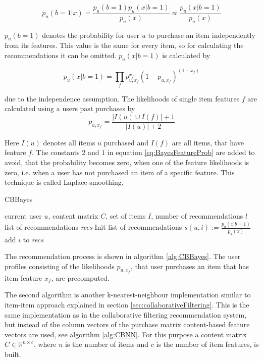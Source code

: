 \documentclass[10pt]{reportMaster}
\begin{document}
\begin{equation}
\label{BayesPost}
	p_u(b=1|x) = \frac{p_u(b=1) p_u(x|b=1)}{p_u(x)} \propto \frac{p_u(x|b=1)}{p_u(x)}
\end{equation}

$p_u(b=1)$ denotes the probability for user $u$ to purchase an item independently from its features.
This value is the same for every item, so for calculating the recommendations it can be omitted.
$p_u(x|b=1)$ is calculated by 

\begin{equation}
\label{BayesEvid}
p_u(x|b=1) = \prod_f{p_{u, x_f}^{x_f}(1-p_{u, x_f})^{(1-x_f)}}
\end{equation}

due to the independence assumption.
The likelihoods of single item features $f$ are calculated using a users past purchases by
\begin{equation}
\label{eq:BayesFeatureProb}
p_{u, x_f} = \frac{|I(u) \cup I(f)|+1}{|I(u)|+2}
\end{equation}

Here $I(u)$ denotes all items $u$ purchased and $I(f)$ are all items, that have feature $f$.
The constants $2$ and $1$ in equation \ref{eq:BayesFeatureProb} are added to avoid, that the probability becomes zero, when one of the feature likelihoods is zero, i.e. when a user has not purchased an item of a specific feature.
This technique is called Laplace-smoothing.

\begin{algorithm}
	\caption[CBBayes]{CBBayes}
	\label{alg:CBBayes}
	\begin{algorithmic}[1]
		\Require current user $u$, content matrix $C$, set of items $I$, number of recommendations $l$
		\Ensure list of recommendations \textit{recs}
		\State Init list of recommendations 
			\State 	$s(u,i) := \frac{p_u(x|b=1)}{p_u(x)}$
				\State add $i$ to \textit{recs}
			\EndIf
		\EndFor
	\end{algorithmic}	
\end{algorithm}

The recommendation process is shown in algorithm \ref{alg:CBBayes}.
The user profiles consisting of the likelihoods $p_{u, x_f}$, that user purchases an item that has item feature $x_f$, are precomputed.

The second algorithm is another k-nearest-neighbour implementation similar to item-item approach explained in section \ref{sec:collaborativeFiltering}.
This is the same implementation as in the collaborative filtering recommendation system, but instead of the column vectors of the purchase matrix content-based feature vectors are used, see algorithm \ref{alg:CBNN}.
For this purpose a content matrix $C \in \mathds{R}^{n \times c}$, where $n$ is the number of items and $c$ is the number of item features, is built.
\end{document}
